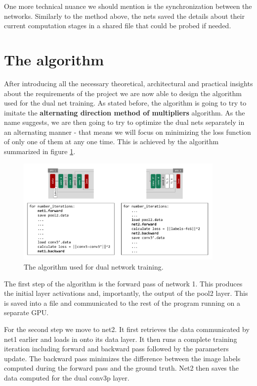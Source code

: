 \documentclass[a4paper, 11pt]{article}
\numberwithin{equation}{section}
\begin{document}
	One more technical nuance we should mention is the synchronization between the networks. Similarly to the method above, the nets saved the details about their current computation stages in a shared file that could be probed if needed.
	
	\section{The algorithm}
	
	After introducing all the necessary theoretical, architectural and practical insights about the requirements of the project we are now able to design the algorithm used for the dual net training. As stated before, the algorithm is going to try to imitate the \textbf{alternating direction method of multipliers} algorithm. As the name suggests, we are then going to try to optimize the dual nets separately in an alternating manner - that means we will focus on minimizing the loss function of only one of them at any one time. This is achieved by the algorithm summarized in figure \ref{fig:algorithm}.
	
	\begin{figure}[!h]
		\centering
		\includegraphics[page=1,width=0.9\textwidth]{algocode.pdf}
		\caption{\label{fig:algorithm}{The algorithm used for dual network training.}}
	\end{figure}
	
	The first step of the algorithm is the forward pass of network 1. This produces the initial layer activations and, importantly, the output of the pool2 layer. This is saved into a file and communicated to the rest of the program running on a separate GPU.
	
	For the second step we move to net2. It first retrieves the data communicated by net1 earlier and loads in onto its data layer. It then runs a complete training iteration including forward and backward pass followed by the parameters update. The backward pass minimizes the difference between the image labels computed during the forward pass and the ground truth. Net2 then saves the data computed for the dual conv3p layer.
	
\end{document}
